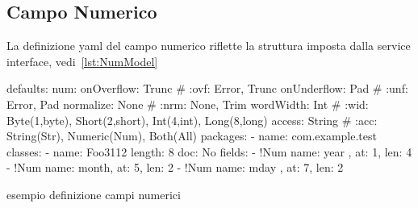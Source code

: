 \documentclass[a4paper,10pt]{report}
\newif\ifesource
\newenvironment{elisting}[1][H]
  {\captionsetup{aboveskip=0pt}\begin{listing}[#1]}
  {\end{listing}%
}
\begin{document}
\subsection{Campo Numerico} \label{sub:yaml.num}
La definizione yaml del campo numerico riflette la struttura imposta dalla
service interface, vedi~\ref{lst:NumModel}

\ifesource
\begin{figure*}[!htb]
\begin{lstlisting}[language=yaml, caption={esempio definizione campi numerici}, 
label=lst:xmplNum]
defaults:
  num:
    onOverflow: Trunc   # :ovf: Error, Trunc
    onUnderflow: Pad    # :unf: Error, Pad
    normalize: None     # :nrm: None, Trim
    wordWidth: Int      # :wid: Byte(1,byte), Short(2,short), Int(4,int), Long(8,long)
    access: String      # :acc: String(Str), Numeric(Num), Both(All)
packages:
  - name: com.example.test
    classes:
      - name: Foo3112
        length: 8
        doc: No
        fields:
          - !Num { name: year , at: 1, len: 4 }
          - !Num { name: month, at: 5, len: 2 }
          - !Num { name: mday , at: 7, len: 2 }
\end{lstlisting}
\end{figure*}
\else
\begin{elisting}[!htb]
\begin{yamlcode}
defaults:
  num:
    onOverflow: Trunc   # :ovf: Error, Trunc
    onUnderflow: Pad    # :unf: Error, Pad
    normalize: None     # :nrm: None, Trim
    wordWidth: Int      # :wid: Byte(1,byte), Short(2,short), Int(4,int), Long(8,long)
    access: String      # :acc: String(Str), Numeric(Num), Both(All)
packages:
  - name: com.example.test
    classes:
      - name: Foo3112
        length: 8
        doc: No
        fields:
          - !Num { name: year , at: 1, len: 4 }
          - !Num { name: month, at: 5, len: 2 }
          - !Num { name: mday , at: 7, len: 2 }
\end{yamlcode}
\caption{esempio definizione campi numerici}
\label{lst:xmplNum}
\end{elisting}
\fi
\end{document}
